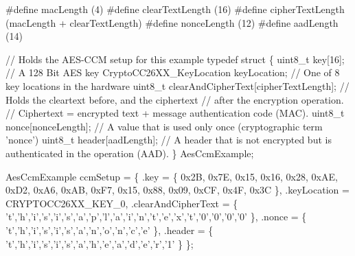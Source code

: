 \begin{DoxyCode}
\textcolor{preprocessor}{#define macLength           (4)}
\textcolor{preprocessor}{#define clearTextLength     (16)}
\textcolor{preprocessor}{#define cipherTextLength    (macLength + clearTextLength)}
\textcolor{preprocessor}{#define nonceLength         (12)}
\textcolor{preprocessor}{#define aadLength           (14)}

\textcolor{comment}{// Holds the AES-CCM setup for this example}
\textcolor{keyword}{typedef} \textcolor{keyword}{struct}
\{
    uint8\_t key[16];                                \textcolor{comment}{// A 128 Bit AES key}
    CryptoCC26XX_KeyLocation keyLocation;           \textcolor{comment}{// One of 8 key locations in the hardware}
    uint8\_t clearAndCipherText[cipherTextLength];   \textcolor{comment}{// Holds the cleartext before, and the ciphertext}
                                                    \textcolor{comment}{// after the encryption operation.}
                                                    \textcolor{comment}{// Ciphertext = encrypted text + message authentication
       code (MAC).}
    uint8\_t nonce[nonceLength];  \textcolor{comment}{// A value that is used only once (cryptographic term 'nonce')}
    uint8\_t header[aadLength];   \textcolor{comment}{// A header that is not encrypted but is authenticated in the operation
       (AAD).}
\} AesCcmExample;

AesCcmExample ccmSetup =
\{
    .key = \{ 0x2B, 0x7E, 0x15, 0x16, 0x28, 0xAE, 0xD2, 0xA6,
             0xAB, 0xF7, 0x15, 0x88, 0x09, 0xCF, 0x4F, 0x3C \},
    .keyLocation = CRYPTOCC26XX_KEY_0,
    .clearAndCipherText = \{ \textcolor{charliteral}{'t'},\textcolor{charliteral}{'h'},\textcolor{charliteral}{'i'},\textcolor{charliteral}{'s'},\textcolor{charliteral}{'i'},\textcolor{charliteral}{'s'},\textcolor{charliteral}{'a'},\textcolor{charliteral}{'p'},\textcolor{charliteral}{'l'},\textcolor{charliteral}{'a'},\textcolor{charliteral}{'i'},\textcolor{charliteral}{'n'},\textcolor{charliteral}{'t'},\textcolor{charliteral}{'e'},\textcolor{charliteral}{'x'},\textcolor{charliteral}{'t'},\textcolor{charliteral}{'0'},\textcolor{charliteral}{'0'},\textcolor{charliteral}{'0'},\textcolor{charliteral}{'0'}
       \},
    .nonce  = \{ \textcolor{charliteral}{'t'},\textcolor{charliteral}{'h'},\textcolor{charliteral}{'i'},\textcolor{charliteral}{'s'},\textcolor{charliteral}{'i'},\textcolor{charliteral}{'s'},\textcolor{charliteral}{'a'},\textcolor{charliteral}{'n'},\textcolor{charliteral}{'o'},\textcolor{charliteral}{'n'},\textcolor{charliteral}{'c'},\textcolor{charliteral}{'e'} \},
    .header = \{ \textcolor{charliteral}{'t'},\textcolor{charliteral}{'h'},\textcolor{charliteral}{'i'},\textcolor{charliteral}{'s'},\textcolor{charliteral}{'i'},\textcolor{charliteral}{'s'},\textcolor{charliteral}{'a'},\textcolor{charliteral}{'h'},\textcolor{charliteral}{'e'},\textcolor{charliteral}{'a'},\textcolor{charliteral}{'d'},\textcolor{charliteral}{'e'},\textcolor{charliteral}{'r'},\textcolor{charliteral}{'1'} \}
\};


\end{DoxyCode}
